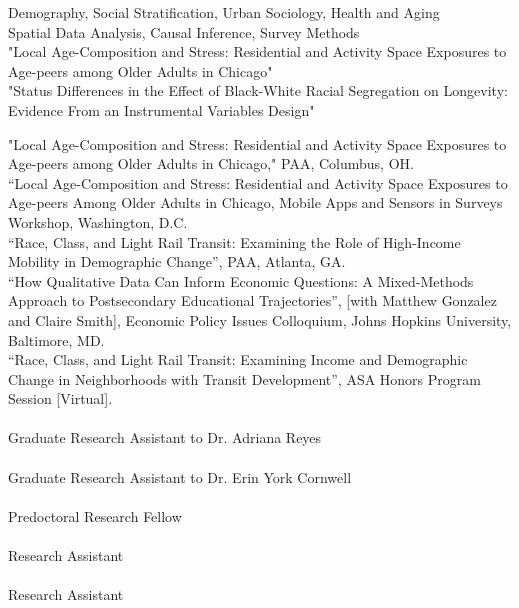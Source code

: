 \documentclass[11pt]{article} %
\begin{document}
\large{} Demography, Social Stratification, Urban Sociology, Health and Aging \\
\large{} Spatial Data Analysis, Causal Inference, Survey Methods \\


"Local Age-Composition and Stress: Residential and Activity Space Exposures to Age-peers among Older Adults in Chicago" \\
"Status Differences in the Effect of Black-White Racial Segregation on Longevity: Evidence From an Instrumental Variables Design" \\


 "Local Age-Composition and Stress: Residential and Activity Space Exposures to Age-peers among Older Adults in Chicago," PAA, Columbus, OH. \\

“Local Age-Composition and Stress: Residential and Activity Space Exposures to Age-peers Among Older Adults in Chicago, Mobile Apps and Sensors in Surveys Workshop, Washington, D.C. \\

 “Race, Class, and Light Rail Transit: Examining the Role of High-Income Mobility in Demographic Change”, PAA, Atlanta, GA. \\

 “How Qualitative Data Can Inform Economic Questions: A Mixed-Methods Approach to Postsecondary Educational Trajectories”, [with Matthew Gonzalez and Claire Smith], Economic Policy Issues Colloquium, Johns Hopkins University, Baltimore, MD. \\
 
  “Race, Class, and Light Rail Transit: Examining Income and Demographic Change in Neighborhoods with Transit Development”, ASA Honors Program Session [Virtual]. \\

 \\ 
Graduate Research Assistant to Dr. Adriana Reyes \\
 \\ 
Graduate Research Assistant to Dr. Erin York Cornwell \\  
 \\ Predoctoral Research Fellow \\
 \\ Research Assistant \\ 
 \\ Research Assistant \\ 
\end{document}
